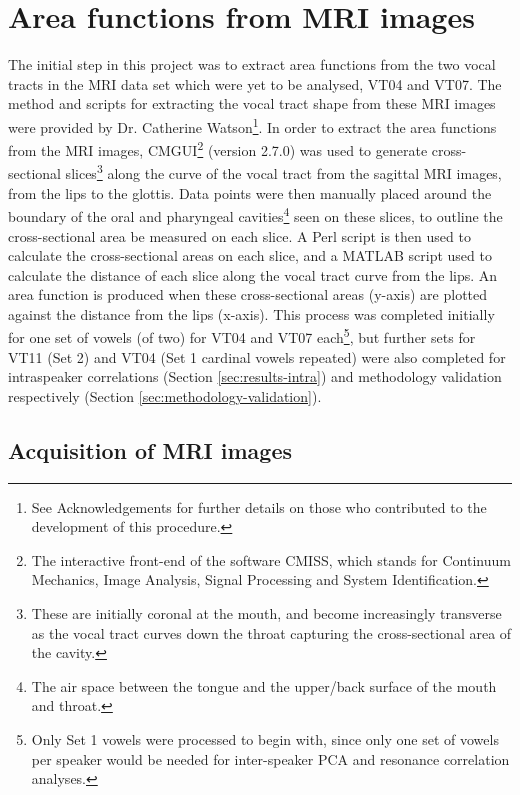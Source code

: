 \section{Area functions from MRI images}

The initial step in this project was to extract area functions from the two vocal tracts in the MRI data set which were yet to be analysed, VT04 and VT07. The method and scripts for extracting the vocal tract shape from these MRI images were provided by Dr. Catherine Watson\footnote{See Acknowledgements for further details on those who contributed to the development of this procedure.}. In order to extract the area functions from the MRI images, CMGUI\footnote{The interactive front-end of the software CMISS, which stands for Continuum Mechanics, Image Analysis, Signal Processing and System Identification.} (version 2.7.0) was used to generate cross-sectional slices\footnote{These are initially coronal at the mouth, and become increasingly transverse as the vocal tract curves down the throat capturing the cross-sectional area of the cavity.} along the curve of the vocal tract from the sagittal MRI images, from the lips to the glottis. Data points were then manually placed around the boundary of the oral and pharyngeal cavities\footnote{The air space between the tongue and the upper/back surface of the mouth and throat.} seen on these slices, to outline the cross-sectional area be measured on each slice. A Perl script is then used to calculate the cross-sectional areas on each slice, and a MATLAB script used to calculate the distance of each slice along the vocal tract curve from the lips. An area function is produced when these cross-sectional areas (y-axis) are plotted against the distance from the lips (x-axis). This process was completed initially for one set of vowels (of two) for VT04 and VT07 each\footnote{Only Set 1 vowels were processed to begin with, since only one set of vowels per speaker would be needed for inter-speaker PCA and resonance correlation analyses.}, but further sets for VT11 (Set 2) and VT04 (Set 1 cardinal vowels repeated) were also completed for intraspeaker correlations (Section \ref{sec:results-intra}) and methodology validation respectively (Section \ref{sec:methodology-validation}).

\subsection{Acquisition of MRI images}

